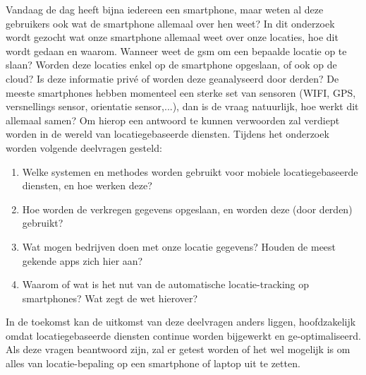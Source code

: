 Vandaag de dag heeft bijna iedereen een smartphone, maar weten al deze gebruikers ook wat de smartphone allemaal over hen weet? In dit onderzoek wordt gezocht wat onze smartphone allemaal weet over onze locaties, hoe dit wordt gedaan en waarom. Wanneer weet de gsm om een bepaalde locatie op te slaan? Worden deze locaties enkel op de smartphone opgeslaan, of ook op de cloud? Is deze informatie priv\'e of worden deze geanalyseerd door derden? De meeste smartphones hebben momenteel een sterke set van sensoren (WIFI, GPS, versnellings sensor, orientatie sensor,...), dan is de vraag natuurlijk, hoe werkt dit allemaal samen? Om hierop een antwoord te kunnen verwoorden zal verdiept worden in de wereld van locatiegebaseerde diensten.
Tijdens het onderzoek worden volgende deelvragen gesteld:
\begin{enumerate}

  \item Welke systemen en methodes worden gebruikt voor mobiele locatiegebaseerde diensten, en hoe werken deze?
  \item Hoe worden de verkregen gegevens opgeslaan, en worden deze (door derden) gebruikt?
  \item Wat mogen bedrijven doen met onze locatie gegevens? Houden de meest gekende apps zich hier aan?
  \item Waarom of wat is het nut van de automatische locatie-tracking op smartphones? Wat zegt de wet hierover?
  
\end{enumerate}
In de toekomst kan de uitkomst van deze deelvragen anders liggen, hoofdzakelijk omdat locatiegebaseerde diensten continue worden bijgewerkt en ge-optimaliseerd.
Als deze vragen beantwoord zijn, zal er getest worden of het wel mogelijk is om alles van locatie-bepaling op een smartphone of laptop uit te zetten.
